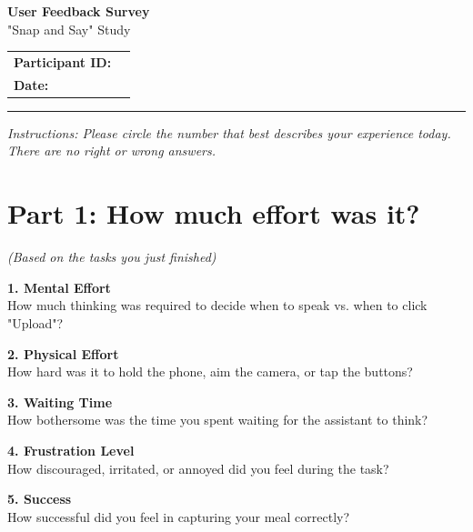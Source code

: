\begin{center}
    {\Huge \textbf{User Feedback Survey}} \\[0.5em]
    {\Large "Snap and Say" Study}
\end{center}

\vspace{0.5cm}

\noindent
\begin{tabular}{@{}ll@{}}
    \textbf{Participant ID:} & \underline{\hspace{5cm}} \\[1em]
    \textbf{Date:}           & \underline{\hspace{5cm}}
\end{tabular}

\vspace{1cm}
\hrule
\vspace{0.5cm}

\noindent \textit{Instructions: Please circle the number that best describes your experience today. There are no right or wrong answers.}

\section*{Part 1: How much effort was it?}
\textit{(Based on the tasks you just finished)}

\vspace{1em}

\noindent \textbf{1. Mental Effort} \\
How much thinking was required to decide when to speak vs. when to click "Upload"?

\noindent \textbf{2. Physical Effort} \\
How hard was it to hold the phone, aim the camera, or tap the buttons?

\noindent \textbf{3. Waiting Time} \\
How bothersome was the time you spent waiting for the assistant to think?

\noindent \textbf{4. Frustration Level} \\
How discouraged, irritated, or annoyed did you feel during the task?

\noindent \textbf{5. Success} \\
How successful did you feel in capturing your meal correctly?

